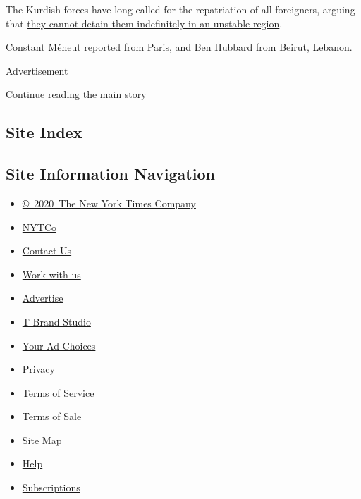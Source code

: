 The Kurdish forces have long called for the repatriation of all
foreigners, arguing that
\href{https://www.nytimes.com/2019/10/13/us/politics/isis-prisoners-kurds.html}{they
cannot detain them indefinitely in an unstable region}.

Constant Méheut reported from Paris, and Ben Hubbard from Beirut,
Lebanon.

Advertisement

\protect\hyperlink{after-bottom}{Continue reading the main story}

\hypertarget{site-index}{%
\subsection{Site Index}\label{site-index}}

\hypertarget{site-information-navigation}{%
\subsection{Site Information
Navigation}\label{site-information-navigation}}

\begin{itemize}
\tightlist
\item
  \href{https://help.nytimes.com/hc/en-us/articles/115014792127-Copyright-notice}{©~2020~The
  New York Times Company}
\end{itemize}

\begin{itemize}
\tightlist
\item
  \href{https://www.nytco.com/}{NYTCo}
\item
  \href{https://help.nytimes.com/hc/en-us/articles/115015385887-Contact-Us}{Contact
  Us}
\item
  \href{https://www.nytco.com/careers/}{Work with us}
\item
  \href{https://nytmediakit.com/}{Advertise}
\item
  \href{http://www.tbrandstudio.com/}{T Brand Studio}
\item
  \href{https://www.nytimes.com/privacy/cookie-policy\#how-do-i-manage-trackers}{Your
  Ad Choices}
\item
  \href{https://www.nytimes.com/privacy}{Privacy}
\item
  \href{https://help.nytimes.com/hc/en-us/articles/115014893428-Terms-of-service}{Terms
  of Service}
\item
  \href{https://help.nytimes.com/hc/en-us/articles/115014893968-Terms-of-sale}{Terms
  of Sale}
\item
  \href{https://spiderbites.nytimes.com}{Site Map}
\item
  \href{https://help.nytimes.com/hc/en-us}{Help}
\item
  \href{https://www.nytimes.com/subscription?campaignId=37WXW}{Subscriptions}
\end{itemize}
